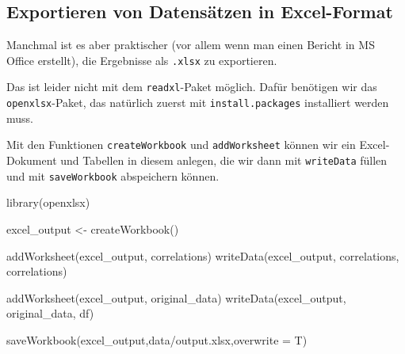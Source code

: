 \documentclass[
]{book}
\newenvironment{Shaded}{\begin{snugshade}}{\end{snugshade}}
\newcommand{\AttributeTok}[1]{\textcolor[rgb]{0.77,0.63,0.00}{#1}}
\newcommand{\FunctionTok}[1]{\textcolor[rgb]{0.00,0.00,0.00}{#1}}
\newcommand{\NormalTok}[1]{#1}
\newcommand{\OtherTok}[1]{\textcolor[rgb]{0.56,0.35,0.01}{#1}}
\newcommand{\StringTok}[1]{\textcolor[rgb]{0.31,0.60,0.02}{#1}}
\begin{document}
\hypertarget{exportieren-von-datensuxe4tzen-in-excel-format}{%
\subsection{Exportieren von Datensätzen in Excel-Format}\label{exportieren-von-datensuxe4tzen-in-excel-format}}

Manchmal ist es aber praktischer (vor allem wenn man einen Bericht in MS Office erstellt), die Ergebnisse als \texttt{.xlsx} zu exportieren.

Das ist leider nicht mit dem \texttt{readxl}-Paket möglich. Dafür benötigen wir das \texttt{openxlsx}-Paket, das natürlich zuerst mit \texttt{install.packages} installiert werden muss.

Mit den Funktionen \texttt{createWorkbook} und \texttt{addWorksheet} können wir ein Excel-Dokument und Tabellen in diesem anlegen, die wir dann mit \texttt{writeData} füllen und mit \texttt{saveWorkbook} abspeichern können.

\begin{Shaded}
\begin{Highlighting}[]
\FunctionTok{library}\NormalTok{(openxlsx)}

\NormalTok{excel\_output }\OtherTok{\textless{}{-}} \FunctionTok{createWorkbook}\NormalTok{()}

\FunctionTok{addWorksheet}\NormalTok{(excel\_output, }\StringTok{\textquotesingle{}correlations\textquotesingle{}}\NormalTok{)}
\FunctionTok{writeData}\NormalTok{(excel\_output, }\StringTok{\textquotesingle{}correlations\textquotesingle{}}\NormalTok{, correlations)}

\FunctionTok{addWorksheet}\NormalTok{(excel\_output, }\StringTok{\textquotesingle{}original\_data\textquotesingle{}}\NormalTok{)}
\FunctionTok{writeData}\NormalTok{(excel\_output, }\StringTok{\textquotesingle{}original\_data\textquotesingle{}}\NormalTok{, df)}

\FunctionTok{saveWorkbook}\NormalTok{(excel\_output,}\StringTok{\textquotesingle{}data/output.xlsx\textquotesingle{}}\NormalTok{,}\AttributeTok{overwrite =}\NormalTok{ T)}
\end{Highlighting}
\end{Shaded}


  
\end{document}

